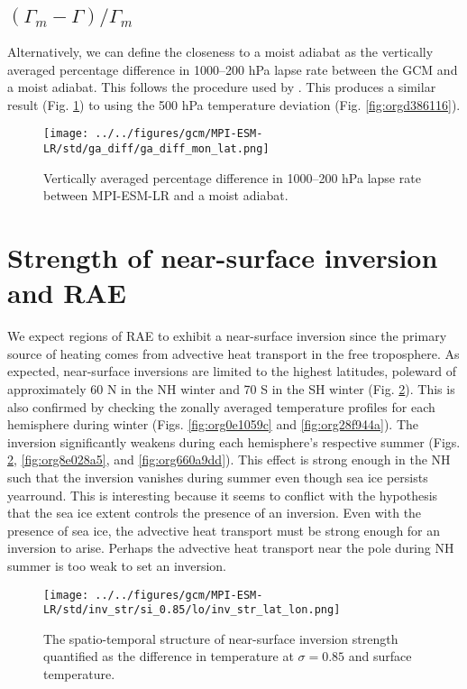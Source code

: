 \documentclass[11pt]{article}
\begin{document}
\subsection{\((\Gamma_m - \Gamma)/\Gamma_m\)}
\label{sec:orgb2afb46}
Alternatively, we can define the closeness to a moist adiabat as the vertically averaged percentage difference in 1000--200 hPa lapse rate between the GCM and a moist adiabat. This follows the procedure used by \cite{stone1979}. This produces a similar result (Fig. \ref{fig:org41c24b1}) to using the 500 hPa temperature deviation (Fig. \ref{fig:orgd386116}).

\begin{figure}[htbp]
\centering
\texttt{[image: ../../figures/gcm/MPI-ESM-LR/std/ga\_diff/ga\_diff\_mon\_lat.png]}
\caption{\label{fig:org41c24b1}Vertically averaged percentage difference in 1000--200 hPa lapse rate between MPI-ESM-LR and a moist adiabat.}
\end{figure}

\section{Strength of near-surface inversion and RAE}
\label{sec:orgdd7ad82}
We expect regions of RAE to exhibit a near-surface inversion since the primary source of heating comes from advective heat transport in the free troposphere. As expected, near-surface inversions are limited to the highest latitudes, poleward of approximately 60 N in the NH winter and 70 S in the SH winter (Fig. \ref{fig:org3c66fec}). This is also confirmed by checking the zonally averaged temperature profiles for each hemisphere during winter (Figs. \ref{fig:org0e1059c} and \ref{fig:org28f944a}). The inversion significantly weakens during each hemisphere's respective summer (Figs. \ref{fig:org3c66fec}, \ref{fig:org8e028a5}, and \ref{fig:org660a9dd}). This effect is strong enough in the NH such that the inversion vanishes during summer even though sea ice persists yearround. This is interesting because it seems to conflict with the hypothesis that the sea ice extent controls the presence of an inversion. Even with the presence of sea ice, the advective heat transport must be strong enough for an inversion to arise. Perhaps the advective heat transport near the pole during NH summer is too weak to set an inversion.

\begin{figure}[htbp]
\centering
\texttt{[image: ../../figures/gcm/MPI-ESM-LR/std/inv\_str/si\_0.85/lo/inv\_str\_lat\_lon.png]}
\caption{\label{fig:org3c66fec}The spatio-temporal structure of near-surface inversion strength quantified as the difference in temperature at \(\sigma=0.85\) and surface temperature.}
\end{figure}
\end{document}

